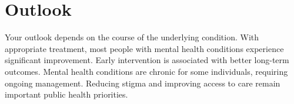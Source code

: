 \section{Outlook}
Your outlook depends on the course of the underlying condition. With appropriate treatment, most people with mental health conditions experience significant improvement. Early intervention is associated with better long-term outcomes. Mental health conditions are chronic for some individuals, requiring ongoing management. Reducing stigma and improving access to care remain important public health priorities.
